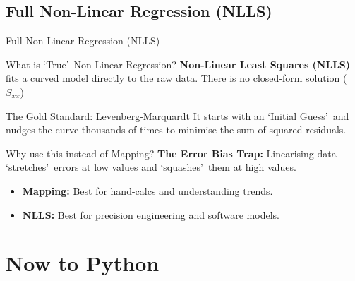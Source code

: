 \subsection{Full Non-Linear Regression (NLLS)}
\begin{frame}{Full Non-Linear Regression (NLLS)}
    \begin{block}{What is \lq True\rq\ Non-Linear Regression?}
        \textbf{Non-Linear Least Squares (NLLS)} fits a curved model directly to the raw data. There is no closed-form solution ($S_{xx}$)
    \end{block}

    \begin{block}{The Gold Standard: Levenberg-Marquardt}
        It starts with an \lq Initial Guess\rq\ and nudges the curve thousands of times to minimise the sum of squared residuals.
    \end{block}

    \begin{alertblock}{Why use this instead of Mapping?}
        \textbf{The Error Bias Trap:} Linearising data \lq stretches\rq\ errors at low values and \lq squashes\rq\ them at high values. 
        
    \end{alertblock}

    \begin{itemize}
        \item \textbf{Mapping:} Best for hand-calcs and understanding trends.
        \item \textbf{NLLS:} Best for precision engineering and software models.
    \end{itemize}
\end{frame}

\section{Now to Python}
\begin{frame}[fragile]







\end{frame}

